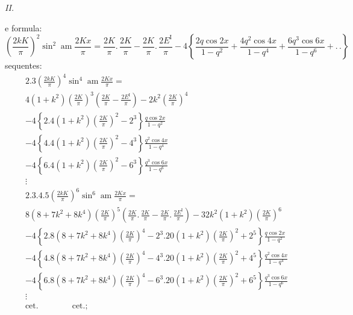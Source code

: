\documentclass{article}
\begin{document}
\emph{II.}

e formula:
\[
\left(\frac{2kK}{\pi}\right)^{2}\sin^{2}\operatorname{am}\frac{2Kx}{\pi}=\frac{2K}{\pi}.\,\frac{2K}{\pi}-\frac{2K}{\pi}.\,\frac{2E^{\mathrm{I}}}{\pi}-4\left\{\frac{2q\cos 2x}{1-q^{2}}+\frac{4q^{2}\cos 4x}{1-q^{4}}+\frac{6q^{3}\cos 6x}{1-q^{6}}+.\,.\right\}
\]
sequentes:
\[
\begin{gathered}
2.3\left(\frac{2kK}{\pi}\right)^{4}\sin^{4}\operatorname{am}\frac{2Kx}{\pi}=\\[1.5ex]
4(1+k^{2})\left(\frac{2K}{\pi}\right)^{3}\left(\frac{2K}{\pi}-\frac{2E^{\mathrm{I}}}{\pi}\right)-2k^{2}\left(\frac{2K}{\pi}\right)^{4}\\[1.5ex]
-4\left\{2.4(1+k^{2})\left(\frac{2K}{\pi}\right)^{2}-2^{3}\right\}\frac{q\cos 2x}{1-q^{2}}\\[1.5ex]
-4\left\{4.4(1+k^{2})\left(\frac{2K}{\pi}\right)^{2}-4^{3}\right\}\frac{q^{2}\cos 4x}{1-q^{4}}\\[1.5ex]
-4\left\{6.4(1+k^{2})\left(\frac{2K}{\pi}\right)^{2}-6^{3}\right\}\frac{q^{3}\cos 6x}{1-q^{6}}\\[1.5ex]
\vdots\\[1.5ex]
2.3.4.5\left(\frac{2kK}{\pi}\right)^{6}\sin^{6}\operatorname{am}\frac{2Kx}{\pi}=\\[1.5ex]
8(8+7k^{2}+8k^{4})\left(\frac{2K}{\pi}\right)^{5}\left(\frac{2K}{\pi}.\,\frac{2K}{\pi}-\frac{2K}{\pi}.\,\frac{2E^{\mathrm{I}}}{\pi}\right)-32k^{2}(1+k^{2})\left(\frac{2K}{\pi}\right)^{6}\\[1.5ex]
-4\left\{2.8(8+7k^{2}+8k^{4})\left(\frac{2K}{\pi}\right)^{4}-2^{3}.20(1+k^{2})\left(\frac{2K}{\pi}\right)^{2}+2^{5}\right\}\frac{q\cos 2x}{1-q^{2}}\\[1.5ex]
-4\left\{4.8(8+7k^{2}+8k^{4})\left(\frac{2K}{\pi}\right)^{4}-4^{3}.20(1+k^{2})\left(\frac{2K}{\pi}\right)^{2}+4^{5}\right\}\frac{q^{2}\cos 4x}{1-q^{4}}\\[1.5ex]
-4\left\{6.8(8+7k^{2}+8k^{4})\left(\frac{2K}{\pi}\right)^{4}-6^{3}.20(1+k^{2})\left(\frac{2K}{\pi}\right)^{2}+6^{5}\right\}\frac{q^{3}\cos 6x}{1-q^{6}}\\[1.5ex]
\vdots\\[1.5ex]
\text{cet.}\qquad\qquad\text{cet.};
\end{gathered}
\]
\end{document}
